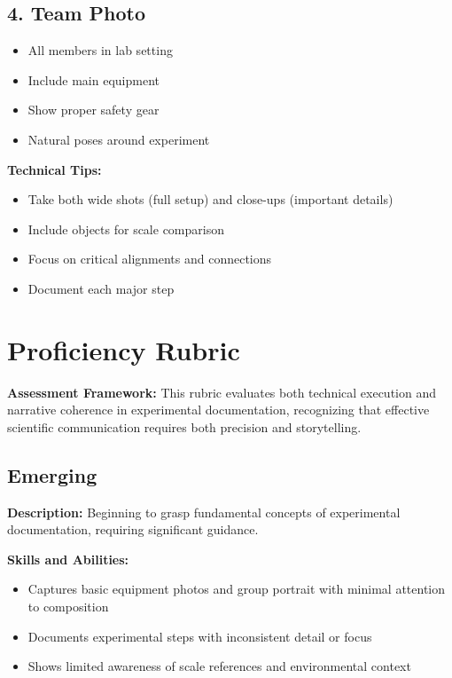 \documentclass[11pt]{article}
\begin{document}
\subsection*{4. Team Photo}
\begin{itemize}[leftmargin=*]
    \item All members in lab setting
    \item Include main equipment
    \item Show proper safety gear
    \item Natural poses around experiment
\end{itemize}

\begin{conceptbox}
\textbf{Technical Tips:}
\begin{itemize}[leftmargin=*]
    \item Take both wide shots (full setup) and close-ups (important details)
    \item Include objects for scale comparison
    \item Focus on critical alignments and connections
    \item Document each major step
\end{itemize}
\end{conceptbox}

\section*{Proficiency Rubric}

\begin{conceptbox}
\textbf{Assessment Framework:} This rubric evaluates both technical execution and narrative coherence in experimental documentation, recognizing that effective scientific communication requires both precision and storytelling.
\end{conceptbox}

\subsection*{Emerging}
\textbf{Description:} Beginning to grasp fundamental concepts of experimental documentation, requiring significant guidance.

\noindent\textbf{Skills and Abilities:}
\begin{itemize}[leftmargin=*]
    \item Captures basic equipment photos and group portrait with minimal attention to composition
    \item Documents experimental steps with inconsistent detail or focus
    \item Shows limited awareness of scale references and environmental context
\end{itemize}
\end{document}
